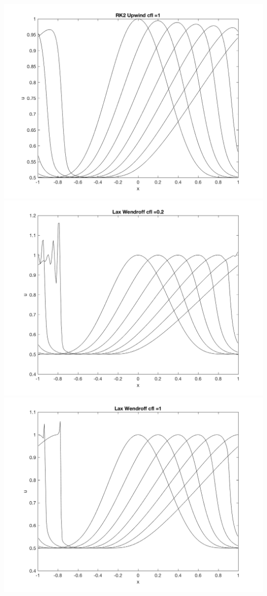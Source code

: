 \documentclass[11pt, oneside]{article}
\begin{document}
\begin{enumerate}
\begin{center}
      \includegraphics[scale=0.5]{Figures/08_08.png}
      \includegraphics[scale=0.5]{Figures/08_09.png}
      \includegraphics[scale=0.5]{Figures/08_010.png}

\end{center}
\end{enumerate}
\end{document}
